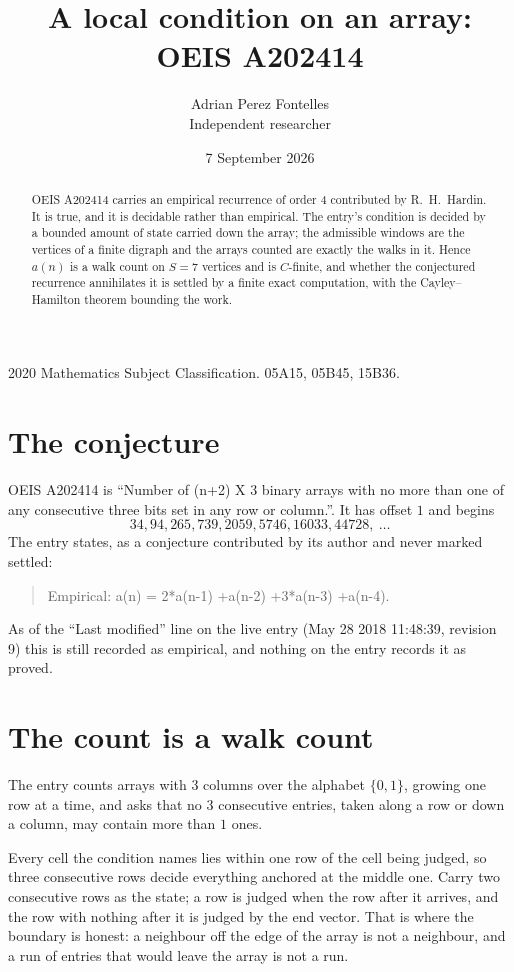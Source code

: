\documentclass[11pt,a4paper]{article}
\title{A local condition on an array: OEIS A202414}
\author{Adrian Perez Fontelles\\ \small Independent researcher}
\date{7 September 2026}
\theoremstyle{plain}
\theoremstyle{definition}
\begin{document}
\maketitle

\begin{abstract}
OEIS A202414 carries an empirical recurrence of order $4$ contributed by R.~H.~Hardin. It is
true, and it is decidable rather than empirical. The entry's condition is decided by a bounded amount of state carried down the array; the
admissible windows are the vertices of a finite digraph and the arrays counted are exactly the
walks in it. Hence $a(n)$ is a walk count on $S=7$ vertices and is $C$-finite, and whether the
conjectured recurrence annihilates it is settled by a finite exact computation, with the
Cayley--Hamilton theorem bounding the work.
\end{abstract}

\noindent\small 2020 Mathematics Subject Classification. 05A15, 05B45, 15B36.\normalsize

\section{The conjecture}

OEIS A202414 is ``Number of (n+2) X 3 binary arrays with no more than one of any consecutive three bits set in any row or column.''. It has offset $1$ and begins
\[
34, 94, 265, 739, 2059, 5746, 16033, 44728,\ \dots
\]
The entry states, as a conjecture contributed by its author and never marked settled:
\begin{quote}
Empirical: a(n) = 2*a(n-1) +a(n-2) +3*a(n-3) +a(n-4).
\end{quote}
As of the ``Last modified'' line on the live entry (May 28 2018 11:48:39, revision 9) this is still
recorded as empirical, and nothing on the entry records it as proved.

\section{The count is a walk count}

The entry counts arrays with $3$ columns over the alphabet $\{0,1\}$, growing one row at a time, and asks that no $3$ consecutive entries, taken along a row or down a column, may contain more than $1$ ones.

Every cell the condition names lies within one row of the cell being judged, so three consecutive rows decide everything anchored at the middle one. Carry two consecutive rows as the state; a row is judged when the row after it arrives, and the row with nothing after it is judged by the end vector. That is where the boundary is honest: a neighbour off the edge of the array is not a neighbour, and a run of entries that would leave the array is not a run.
\end{document}
